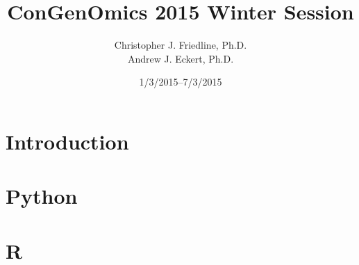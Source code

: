 \documentclass{article}
\title{ConGenOmics 2015 Winter Session}
\date{1/3/2015--7/3/2015}
\author{Christopher J. Friedline, Ph.D.\\Andrew J. Eckert, Ph.D.}
\begin{document}
\maketitle
\section*{Introduction}

\section*{Python}

\section*{R}
\end{document}
